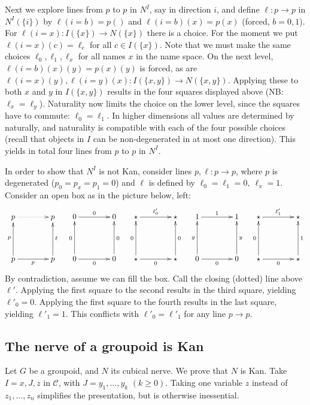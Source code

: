 \documentclass[10pt,a4paper]{article}
\newcommand{\CC}{{\mathcal C}}
\newcommand{\set}[1]{\{#1\}}
\begin{document}
Next we explore lines from $p$ to $p$ in $N^I$,
say in direction $i$,
and define $\ell:p\to p$ in $N^I(\set{i})$ by
$\ell(i=b) = p()$ and $\ell(i=b)(x) = p(x)$ (forced, $b=0,1$).
For $\ell(i=x): I(\set{x})\to N(\set{x})$ there is a choice. For the moment
we put $\ell(i=x)(c) = \ell_c$ for all $c\in I(\set{x})$. Note that we must make
the same choices $\ell_0,\ell_1,\ell_x$ for all names $x$ in the name space.
On the next level, $\ell(i=b)(x)(y) = p(x)(y)$ is forced, as
are $\ell(i=x)(y),\ell(i=y)(x): I(\set{x,y})\to N(\set{x,y})$.
Applying these to both $x$ and $y$ in $I(\set{x,y})$ results
in the four squares displayed above (NB: $\ell_x=\ell_y$).
Naturality now limits the choice on the lower level,
since the squares have to commute: $\ell_0 = \ell_1$.
In higher dimensions all values are determined by naturally,
and naturality is compatible
with each of the four possible choices (recall that
objects in $I$ can be non-degenerated in at most one direction).
This yields in total four lines from $p$ to $p$ in $N^I$.

In order to show that $N^I$ is not Kan, consider lines $p,\ell: p\to p$,
where $p$ is degenerated ($p_0=p_x=p_1=0$)
and $\ell$ is defined by $\ell_0=\ell_1=0,~\ell_x=1$.
Consider an open box as in the picture below, left:
\[
\xymatrix@R=.6cm@C=.6cm{
p\ar@{.>}[rr]&      & p   &  0\ar[rr]^{0}&      & 0  &  \star\ar[rr]^{\ell'_0}&      & \star
&  1\ar[rr]^{1}&      & 1 &  \star\ar[rr]^{\ell'_1}&      & \star \\
                    &&    &        &&    &    &&       &        &&    &    &&       \\
p\ar[rr]_{p}\ar[uu]^{p}& & p\ar[uu]_{\ell} &
0\ar[rr]_{0}\ar[uu]^{0}& & 0\ar[uu]_{0}    &
\star\ar[rr]_{0}\ar[uu]^{0}& & \star\ar[uu]_{0}  &
0\ar[rr]_{0}\ar[uu]^{y}& & 0\ar[uu]_{y}    &
\star\ar[rr]_{0}\ar[uu]^{0}& & \star\ar[uu]_{1}     \\
}
\]
By contradiction, assume we can fill the box.
Call the closing (dotted) line above $\ell'$.
Applying the first square to the second results in the third square,
yielding $\ell'_0 = 0$.
Applying the first square to the fourth results in the last square,
yielding $\ell'_1 = 1$.
This conflicts with $\ell'_0 = \ell'_1$ for any line $p\to p$.

\subsection{The nerve of a groupoid is Kan}\label{sec:groupoidnerve}
Let $G$ be a groupoid, and $N$ its cubical nerve.
We prove that $N$ is Kan. Take $I=x,J,z$ in $\CC$,
with $J=y_1,\ldots,y_k$ $(k\geq 0)$. Taking one variable $z$ instead of
$z_1,\ldots,z_n$ simplifies the presentation, but is otherwise inessential.
\end{document}
